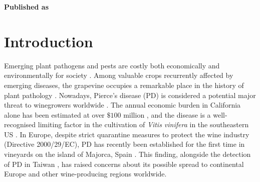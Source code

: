 \vspace{3cm}





\textbf{Published as}

\vspace{0.5cm}


\newpage
\section{Introduction}
Emerging plant pathogens and pests are costly both economically and
environmentally for society \cite{Carvajal2019,
    Mooney2001,Pimentel2000,Spence2020}. Among valuable crops recurrently
affected
by emerging diseases, the grapevine occupies a remarkable place in the history
of plant pathology \cite{Borkarbook, Brewer2010, Rouxel2014, Tello2019}.
Nowadays, Pierce's disease (PD) is considered a potential major threat to
winegrowers worldwide \cite{Hopkins2002}. The annual economic burden in
California alone has been estimated at over $\$ 100$ million \cite{Tumber2014},
and the disease is a well-recognised limiting factor in the cultivation of
\textit{Vitis vinifera} in the southeastern US \cite{Hopkins2002}. In Europe,
despite strict quarantine measures to protect the wine industry (Directive
2000/29/EC), PD has recently been established for the first time in vineyards
on the island of Majorca, Spain \cite{Gomila2019, Moralejo2019}. This finding,
alongside the detection of PD in Taiwan \cite{Su2013}, has raised concerns
about its possible spread to continental Europe and other wine-producing
regions worldwide.

